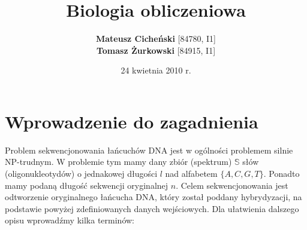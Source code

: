 \documentclass[a4paper,10pt]{article}
\title{\textbf{Biologia obliczeniowa}}
\author{\textbf{Mateusz Cicheński} [84780, I1]\\ \textbf{Tomasz Żurkowski} [84915, I1]}
\date{24 kwietnia 2010 r.}
\begin{document}
 
\maketitle

\tableofcontents

\newpage

\section{Wprowadzenie do zagadnienia}

Problem sekwencjonowania łańcuchów DNA jest w ogólności problemem silnie NP-trudnym. W problemie tym mamy
dany zbiór (spektrum) $\mathbb{S}$ słów (oligonukleotydów) o jednakowej długości $l$ nad alfabetem $\{A, C, G, T\}$.
Ponadto mamy podaną długość sekwencji oryginalnej $n$. Celem sekwencjonowania jest odtworzenie oryginalnego łańcucha DNA, 
który został poddany hybrydyzacji, na podstawie powyżej zdefiniowanych danych wejściowych.
Dla ułatwienia dalszego opisu wprowadźmy kilka terminów: 
\end{document}
